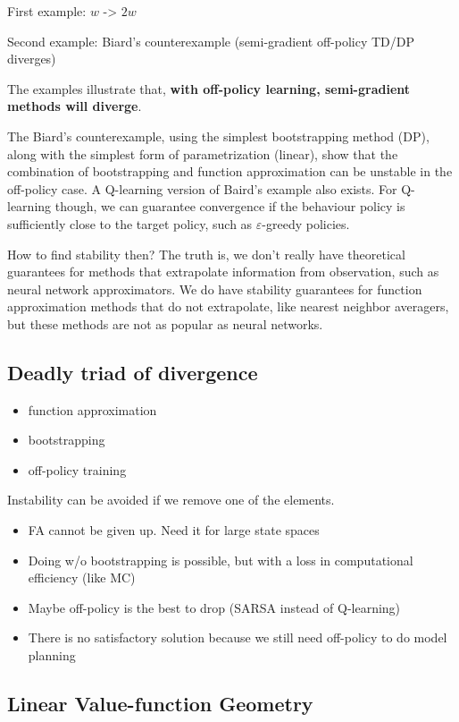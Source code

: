 \documentclass[sutton_barto_notes.tex]{subfiles}
\begin{document}
First example: $w$ -> $2w$

Second example: Biard's counterexample (semi-gradient off-policy TD/DP diverges)

The examples illustrate that, \textbf{with off-policy learning, semi-gradient methods will diverge}.

The Biard's counterexample, using the simplest bootstrapping method (DP), along with the simplest form of parametrization (linear), show that the combination of bootstrapping and function approximation can be unstable in the off-policy case. A Q-learning version of Baird’s example also exists. For Q-learning though, we can guarantee convergence if the behaviour policy is sufficiently close to the target policy, such as $\varepsilon$-greedy policies.

How to find stability then? The truth is, we don’t really have theoretical guarantees for methods that extrapolate information from observation, such as neural network approximators. We do have stability guarantees for function approximation methods that do not extrapolate, like nearest neighbor averagers, but these methods are not as popular as neural networks.

\subsection{Deadly triad of divergence}

\begin{itemize}
\item function approximation
\item bootstrapping
\item off-policy training
\end{itemize}

Instability can be avoided if we remove one of the elements.
\begin{itemize}
\item FA cannot be given up. Need it for large state spaces
\item Doing w/o bootstrapping is possible, but with a loss in computational efficiency (like MC)
\item Maybe off-policy is the best to drop (SARSA instead of Q-learning)
\item There is no satisfactory solution because we still need off-policy to do model planning
\end{itemize}

\subsection{Linear Value-function Geometry}
\end{document}
